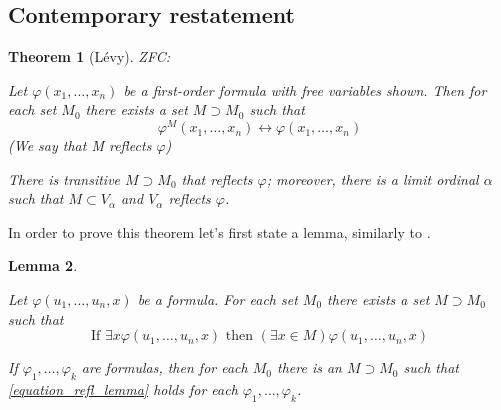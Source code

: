 \documentclass[12pt,a4paper]{article}
\newtheorem{theorem}{Theorem}[section]
\newtheorem{lemma}[theorem]{Lemma}
\renewcommand{\iff}{\leftrightarrow}
\newcommand{\bce}{\begin{compactenum}}
\newcommand{\ece}{\end{compactenum}}
\begin{document}
\subsection{Contemporary restatement} %


\medskip

\begin{theorem}[L{\'e}vy] \label{th:refl} ZFC: 
\bce[(i)]
\item Let $\varphi(x_1, \ldots, x_n)$ be a first-order formula with free variables shown. Then for each set $M_0$ there exists a set $M \supset M_0$ such that
\begin{equation}
\varphi^M (x_1,\ldots,x_n) \iff \varphi(x_1,\ldots,x_n)
\end{equation}
(We say that M reflects $\varphi$)
\item There is transitive $M \supset M_0$ that reflects $\varphi$; moreover, there is a limit ordinal $\alpha$ such that $M \subset V_\alpha$ and $V_\alpha$ reflects $\varphi$.
\ece
\end{theorem}

In order to prove this theorem let's first state a lemma, similarly to \cite{JechBook}.
\begin{lemma}
\bce[(i)]
\item Let $\varphi(u_1,\ldots,u_n,x)$ be a formula. For each set $M_0$ there exists a set $M \supset M_0$ such that
\begin{equation}\label{equation_refl_lemma}
\mbox{If }\exists x \varphi(u_1,\ldots,u_n,x) \mbox{ then } (\exists x \in M)\varphi (u_1,\ldots,u_n,x)
\end{equation}
\item If $\varphi_1,\ldots,\varphi_k$ are formulas, then for each $M_0$ there is an $M \supset M_0$ such that \ref{equation_refl_lemma} holds for each $\varphi_1,\ldots,\varphi_k$.
\ece
\end{lemma}
\end{document}
